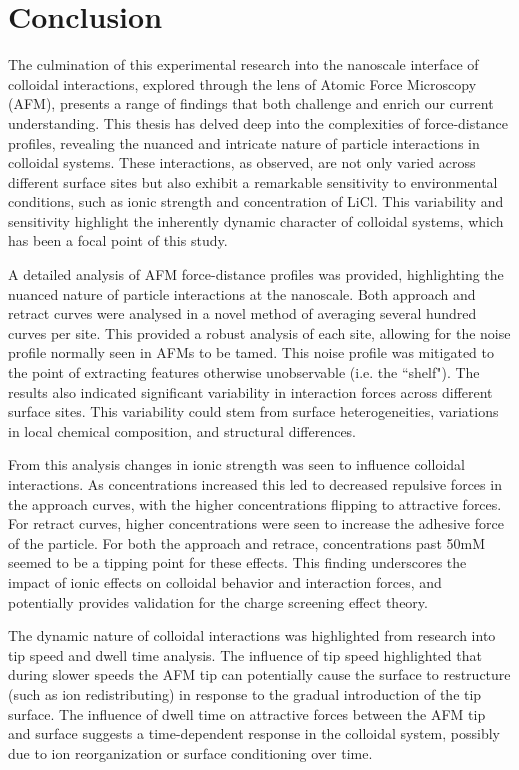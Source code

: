 \chapter{Conclusion}

The culmination of this experimental research into the nanoscale interface of colloidal interactions, explored through the lens of Atomic Force Microscopy (AFM), presents a range of findings that both challenge and enrich our current understanding. This thesis has delved deep into the complexities of force-distance profiles, revealing the nuanced and intricate nature of particle interactions in colloidal systems. These interactions, as observed, are not only varied across different surface sites but also exhibit a remarkable sensitivity to environmental conditions, such as ionic strength and concentration of LiCl. This variability and sensitivity highlight the inherently dynamic character of colloidal systems, which has been a focal point of this study.

A detailed analysis of AFM force-distance profiles was provided, highlighting the nuanced nature of particle interactions at the nanoscale. Both approach and retract curves were analysed in a novel method of averaging several hundred curves per site. This provided a robust analysis of each site, allowing for the noise profile normally seen in AFMs to be tamed. This noise profile was mitigated to the point of extracting features otherwise unobservable (i.e. the ``shelf"). The results also indicated significant variability in interaction forces across different surface sites. This variability could stem from surface heterogeneities, variations in local chemical composition, and structural differences. 

From this analysis changes in ionic strength was seen to influence colloidal interactions. As concentrations increased this led to decreased repulsive forces in the approach curves, with the higher concentrations flipping to attractive forces. For retract curves, higher concentrations were seen to increase the adhesive force of the particle. For both the approach and retrace, concentrations past 50mM seemed to be a tipping point for these effects. This finding underscores the impact of ionic effects on colloidal behavior and interaction forces, and potentially provides validation for the charge screening effect theory.

The dynamic nature of colloidal interactions was highlighted from research into tip speed and dwell time analysis. The influence of tip speed highlighted that during slower speeds the AFM tip can potentially cause the surface to restructure (such as ion redistributing) in response to the gradual introduction of the tip surface. The influence of dwell time on attractive forces between the AFM tip and surface suggests a time-dependent response in the colloidal system, possibly due to ion reorganization or surface conditioning over time. 


